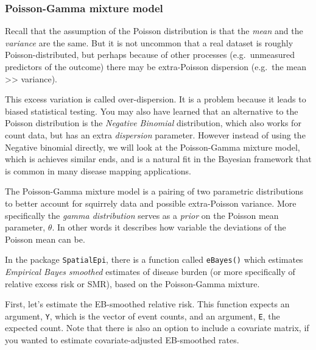 \documentclass[
]{book}
\newenvironment{Shaded}{\begin{snugshade}}{\end{snugshade}}
\newcommand{\CommentTok}[1]{\textcolor[rgb]{0.56,0.35,0.01}{\textit{#1}}}
\newcommand{\FunctionTok}[1]{\textcolor[rgb]{0.00,0.00,0.00}{#1}}
\newcommand{\NormalTok}[1]{#1}
\newcommand{\OtherTok}[1]{\textcolor[rgb]{0.56,0.35,0.01}{#1}}
\newcommand{\SpecialCharTok}[1]{\textcolor[rgb]{0.00,0.00,0.00}{#1}}
\begin{document}
\hypertarget{poisson-gamma-mixture-model}{%
\subsubsection{Poisson-Gamma mixture model}\label{poisson-gamma-mixture-model}}

Recall that the assumption of the Poisson distribution is that the \emph{mean} and the \emph{variance} are the same. But it is not uncommon that a real dataset is roughly Poisson-distributed, but perhaps because of other processes (e.g.~unmeasured predictors of the outcome) there may be extra-Poisson dispersion (e.g.~the mean \textgreater\textgreater{} variance).

This excess variation is called over-dispersion. It is a problem because it leads to biased statistical testing. You may also have learned that an alternative to the Poisson distribution is the \emph{Negative Binomial} distribution, which also works for count data, but has an extra \emph{dispersion} parameter. However instead of using the Negative binomial directly, we will look at the Poisson-Gamma mixture model, which is achieves similar ends, and is a natural fit in the Bayesian framework that is common in many disease mapping applications.

The Poisson-Gamma mixture model is a pairing of two parametric distributions to better account for squirrely data and possible extra-Poisson variance. More specifically the \emph{gamma distribution} serves as a \emph{prior} on the Poisson mean parameter, \(\theta\). In other words it describes how variable the deviations of the Poisson mean can be.

In the package \texttt{SpatialEpi}, there is a function called \texttt{eBayes()} which estimates \emph{Empirical Bayes smoothed} estimates of disease burden (or more specifically of relative excess risk or SMR), based on the Poisson-Gamma mixture.

First, let's estimate the EB-smoothed relative risk. This function expects an argument, \texttt{Y}, which is the vector of event counts, and an argument, \texttt{E}, the expected count. Note that there is also an option to include a covariate matrix, if you wanted to estimate covariate-adjusted EB-smoothed rates.

\begin{Shaded}
\end{Shaded}
\end{document}
